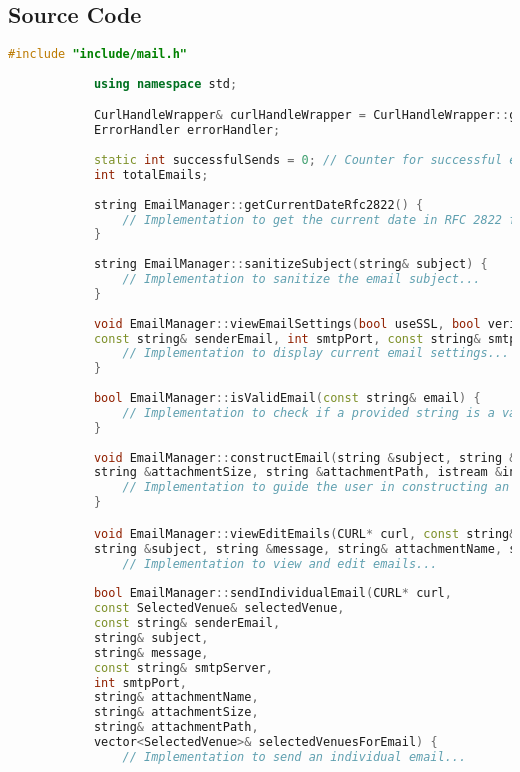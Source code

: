 \documentclass{article}
\begin{document}
	\subsection*{Source Code}
	\begin{mdframed}[backgroundcolor=background, hidealllines=false, innerleftmargin=15pt, innerrightmargin=5pt, innertopmargin=0pt, innerbottommargin=-5pt, linecolor=accent]
		\begin{lstlisting}[language=C++]
			#include "include/mail.h"
			
			using namespace std;

			CurlHandleWrapper& curlHandleWrapper = CurlHandleWrapper::getInstance();
			ErrorHandler errorHandler;
			
			static int successfulSends = 0; // Counter for successful email sends
			int totalEmails;
			
			string EmailManager::getCurrentDateRfc2822() {
				// Implementation to get the current date in RFC 2822 format...
			}
			
			string EmailManager::sanitizeSubject(string& subject) {
				// Implementation to sanitize the email subject...
			}
			
			void EmailManager::viewEmailSettings(bool useSSL, bool verifyPeer, bool verifyHost, bool verbose,
			const string& senderEmail, int smtpPort, const string& smtpServer) {
				// Implementation to display current email settings...
			}
			
			bool EmailManager::isValidEmail(const string& email) {
				// Implementation to check if a provided string is a valid email format...
			}
			
			void EmailManager::constructEmail(string &subject, string &message, string &attachmentName, 
			string &attachmentSize, string &attachmentPath, istream &in) {
				// Implementation to guide the user in constructing an email...
			}

			void EmailManager::viewEditEmails(CURL* curl, const string& smtpServer, int smtpPort, vector<SelectedVenue>& selectedVenuesForEmail, const string& senderEmail, 
			string &subject, string &message, string& attachmentName, string& attachmentSize, string& attachmentPath, bool& templateExists) {
				// Implementation to view and edit emails...
				
			bool EmailManager::sendIndividualEmail(CURL* curl,
			const SelectedVenue& selectedVenue,
			const string& senderEmail,
			string& subject,
			string& message,
			const string& smtpServer,
			int smtpPort,
			string& attachmentName,
			string& attachmentSize,
			string& attachmentPath,
			vector<SelectedVenue>& selectedVenuesForEmail) {
				// Implementation to send an individual email...
			

\end{lstlisting}
\end{mdframed}
\end{document}
